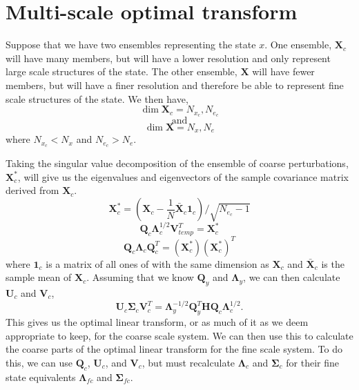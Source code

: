 \documentclass[11pt]{article} %
\newcommand{\mat}{\mathbf}
\begin{document}
\section{Multi-scale optimal transform}

Suppose that we have two ensembles representing the state $x$.
One ensemble, $\mat{X}_c$ will have many members, but will have a lower
resolution and only represent large scale structures of the state.
The other ensemble, $\mat{X}$ will have fewer members, but will
have a finer resolution and therefore be able to represent fine scale
structures of the state.
We then have,
\[
  \dim \mat{X}_c = N_{x_c}, N_{e_c}
\]
\[\text{and}\]
\[
  \dim \mat{X} = N_x, N_e
\]
where $N_{x_c} < N_x$ and $N_{e_c} > N_e$.

Taking the singular value decomposition of the ensemble of
coarse perturbations, $\mat{X}_c^*$, will give us the eigenvalues and
eigenvectors of the sample covariance matrix derived from $\mat{X}_c$.
\[
  \mat{X}_c^{*} = \left( \mat{X}_c - \frac{1}{N}\bar{\mat{X}}_c
  \mat{1}_c \right) / \sqrt{N_{e_c} - 1}
\]
\[
  \mat{Q}_c \mat{\Lambda}_c^{1/2} \mat{V}^T_{temp} = \mat{X}_c^*
\]
\[
  \mat{Q}_c \mat{\Lambda}_c \mat{Q}_c^T = (\mat{X}_c^*)
  {(\mat{X}_c^*)}^{T}
\]
where $\mat{1}_c$ is a matrix of all ones of with the same dimension as
$\mat{X}_c$ and $\bar{\mat{X}}_c$ is the sample mean of $\mat{X}_c$.
Assuming that we know $\mat{Q}_y$ and $\mat{\Lambda}_y$, we can then
calculate $\mat{U}_c$ and $\mat{V}_c$,
\[
  \mat{U}_c \mat{\Sigma}_c \mat{V}_c^T = \mat{\Lambda}^{-1/2}_y
  \mat{Q}_y^T \mat{H} \mat{Q}_c \mat{\Lambda}^{1/2}_c.
\]
This gives us the optimal linear transform, or as much of it as we
deem appropriate to keep, for the coarse scale system.
We can then use this to calculate the coarse parts of the optimal
linear transform for the fine scale system.
To do this, we can use $\mat{Q}_c$, $\mat{U}_c$, and $\mat{V}_c$, but
must recalculate $\mat{\Lambda}_c$ and $\mat{\Sigma}_c$ for their fine
state equivalents $\mat{\Lambda}_{fc}$ and $\mat{\Sigma}_{fc}$.
\end{document}
